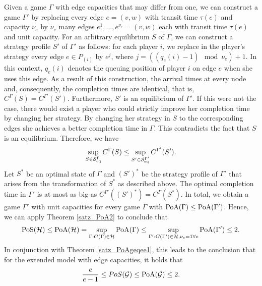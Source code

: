 Given a game $\Gamma$ with edge capacities that may differ from one, we can construct a game $\Gamma'$ by replacing every edge $e=(v,w)$ with transit time $\tau(e)$ and capacity $\nu_e$ by $\nu_e$ many edges $e^1, \ldots,e^{\nu_e}=(v,w)$ each with transit time $\tau(e)$ and unit capacity.
For an arbitrary equilibrium $S$ of $\Gamma$, we can construct a strategy profile $S'$ of $\Gamma'$ as follows: for each player $i$, we replace in the player's strategy every edge $e\in P_{(i)}$ by $e^j$, where $j=((q_e(i)-1 )\mod \nu_e)+1$. In this context, $q_e(i)$ denotes the queuing position of player $i$ on edge $e$ when she uses this edge. As a result of this construction, the arrival times at every node and, consequently, the completion times are identical, that is, $C^{\Gamma}(S)=C^{\Gamma'}(S')$. Furthermore, $S'$ is an equilibrium of $\Gamma'$. If this were not the case, there would exist a player who could strictly improve her completion time by changing her strategy. By changing her strategy in $S$ to the corresponding edges she achieves a better completion time in $\Gamma$. This contradicts the fact that $S$ is an equilibrium. Therefore, we have 
$$\sup_{S\in \mathcal{S}_{\operatorname{eq}}^{\Gamma}} C^{\Gamma}(S) \leq \sup_{S'\in \mathcal{S}_{\operatorname{eq}}^{\Gamma'}} C^{\Gamma'}(S').$$
Let $S^*$ be an optimal state of $\Gamma$ and $(S')^*$ be the strategy profile of $\Gamma'$ that arises from the transformation of $S^*$ as described above. The optimal completion time in $\Gamma'$ is at most as big as $C^{\Gamma'}((S')^*)=C^{\Gamma}(S^*)$. 
In total, we obtain a game $\Gamma'$ with unit capacities for every game $\Gamma$ with $\operatorname*{PoA}(\Gamma)\leq \operatorname*{PoA}(\Gamma')$. Hence, we can apply Theorem \ref{satz_PoA2} to conclude that
\begin{align*}
    \operatorname*{PoS}(\mathcal{H}) \leq \operatorname*{PoA}(\mathcal{H}) = \sup\limits_{\Gamma: G(\Gamma) \in \mathcal{H}} \operatorname*{PoA}(\Gamma) \leq \sup\limits_{\Gamma': G(\Gamma') \in \mathcal{H}, \nu_e = 1 \forall e} \operatorname*{PoA}(\Gamma') \leq 2.
\end{align*}
In conjunction with Theorem \ref{satz_PoAgeqee1}, this leads to the conclusion that for the extended model with edge capacities, it holds that $$\frac{e}{e-1}\leq PoS(\mathcal{G}) \leq \operatorname*{PoA}(\mathcal{G})\leq 2.$$ 

